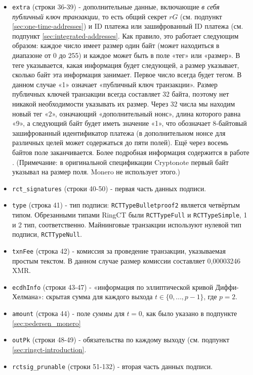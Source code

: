 \begin{appendices}
\begin{itemize}
	\item {\tt extra} (строки 36-39) - дополнительные данные, включающие {\em в себя публичный ключ транзакции}, то есть общий секрет $r G$ (см. подпункт \ref{sec:one-time-addresses}) и ID платежа или зашифрован\-ный ID платежа (см. подпункт \ref{sec:integrated-addresses}. Как правило, это работает следующим образом: каждое число имеет размер один байт (может находиться в диапазоне от 0 до 255) и каждое может быть в поле «тег» или «размер». В теге указывается, какая информация будет следующей, а размер указывает, сколько байт эта информация занимает. Первое число всегда будет тегом. В данном случае «1» означает «публичный ключ транзакции». Размер публичных ключей транзакции всегда составляет 32 байта, поэтому нет никакой необходимости указывать их размер. Через 32 числа мы находим новый тег «2», озна\-чающий «дополнительный нонс», длина которого равна «9», а следующий байт будет иметь значение «1», что обозначает 8-байтовый зашифрованный идентификатор плате\-жа (в дополнительном нонсе для различных целей может содержаться до пяти полей). Ещё через восемь байтов поле заканчивается. Более подробная информация содержится в работе \cite{extra-field-stackexchange}. (Примечание: в оригинальной спецификации Cryptonote первый байт указывал на размер поля.  Monero не использует этого.) \cite{tx-extra-field}
	\item {\tt rct\_signatures} (строки 40-50) - первая часть данных подписи.
	\item {\tt type} (строка 41) - тип подписи: {\tt RCTTypeBulletproof2} является четвёртым типом. Обре\-занными типами RingCT были {\tt RCTTypeFull} и {\tt RCTTypeSimple}, 1 и 2 тип, соответственно. Майнинговые транзакции используют нулевой тип подписи, {\tt RCTTypeNull}.
	\item {\tt txnFee} (строка 42) - комиссия за проведение транзакции, указываемая простым текстом. В данном случае размер комиссии составляет 0,00003246 XMR.
	\item {\tt ecdhInfo} (строки 43-47) - «информация по эллиптической кривой Диффи-Хелмана»: скрытая сумма для каждого выхода $t \in \{0, ..., p-1\}$, где $p = 2$.
    \item {\tt amount} (строка 44) - поле {\sl суммы} для $t = 0$, как было указано в подпункте \ref{sec:pedersen_monero}
    \item {\tt outPk} (строки 48-49) - обязательства по каждому выходу (см. подпункт \ref{sec:ringct-introduction}.
    \item {\tt rctsig\_prunable} (строки 51-132) - вторая часть данных подписи.

\end{itemize}
\end{appendices}
